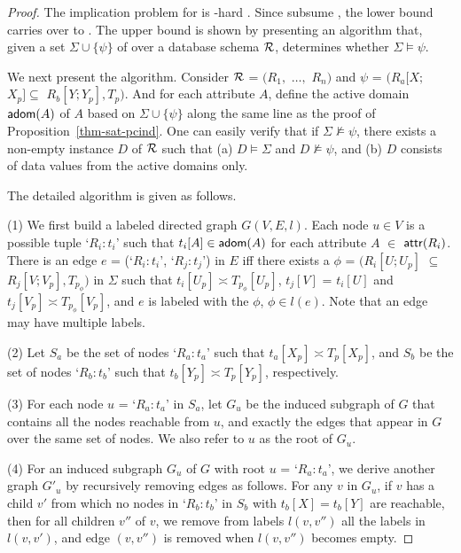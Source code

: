 \begin{proof}
The implication problem for \CINDs is
\EXPTIME-hard \cite{tcs-CINDs}. Since \pCINDs subsume \CINDs, the lower bound carries over to \pCINDs. 
The \EXPTIME upper bound is shown
by presenting an \EXPTIME algorithm that, given a set
$\Sigma\cup\{\psi\}$ of \pCINDs over a database schema $\cal R$,
determines whether $\Sigma\models\psi$.

We next present the \EXPTIME algorithm.
%
Consider $\cal R$ = $(R_1,$ $\ldots,$ $R_n)$ and $\psi$ = $(R_a[X;$ $X_p]
\subseteq$ $R_b[Y;Y_p], T_p)$. And for each attribute $A$,
define the active domain ${\mathsf{adom}}(A)$ of $A$ based on
$\Sigma\cup\{\psi\}$ along the same line as the proof of
Proposition~\ref{thm-sat-pcind}. One can easily verify that if
$\Sigma\not\models\psi$, there exists a non-empty instance $D$ of ${\cal
R}$ such that (a) $D\models\Sigma$ and $D\not\models\psi$, and (b) $D$ consists of data values from the active domains only.

The detailed \EXPTIME algorithm is given as follows.

\bi
\item[(1)]
We first build a labeled directed graph $G(V, E, l)$.  Each node $u\in V$ is a possible
tuple `$R_i:t_i$' such that $t_i[A]\in {\ensuremath {\mathsf{adom}}}(A)$ for each attribute
$A$ $\in$ $\protect\mathsf{attr}(R_i)$. There is an edge $e$ = (`$R_i:t_i$',
`$R_j:t_j$') in $E$ iff there exists a \pCIND $\phi$ =
$(R_i[U; U_p]$ $\subseteq$ $ R_j[V; V_p], T_{p_{\phi}})$ in $\Sigma$
such that $t_i[U_p] \asymp T_{p_{\phi}}[U_p]$, $t_j[V]$ = $t_i[U]$
and $t_j[V_p] \asymp T_{p_{\phi}}[V_p]$, and $e$ is labeled with the \pCIND $\phi$, \ie  $\phi \in l(e)$. Note that an edge may have multiple labels. 

\item[(2)]
Let $S_a$ be the set of nodes `$R_a:t_a$' such that $t_a[X_p] \asymp T_{p}[X_p]$, and $S_b$ be the
set of nodes `$R_b:t_b$' such that $t_b[Y_p] \asymp T_{p}[Y_p]$, respectively. 

\item[(3)]
For each node $u$ = `$R_a:t_a$' in $S_a$, let $G_u$ be the induced  subgraph of $G$ that contains all the nodes reachable from $u$,
and exactly  the edges that appear in $G$ over the same set of nodes. We also refer to $u$ as the root of $G_u$.
 


 \item[(4)] 
For an induced subgraph $G_u$ of $G$ with root $u$ = `$R_a:t_a$', we derive another graph $G'_u$ by recursively removing edges as follows. For any $v$ in $G_u$, if $v$ has a child $v'$ from which no nodes in `$R_b:t_b$' in $S_b$ with $t_b[X] = t_b[Y]$ are reachable, then for all children $v''$ of $v$, we remove from labels $l(v, v'')$ all the labels in $l(v, v')$, and edge $(v, v'')$ is removed when $l(v, v'')$ becomes empty.  


\end{proof}
